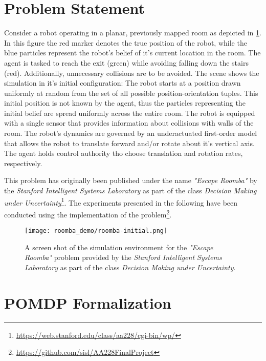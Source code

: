 \section{Problem Statement}\label{sec:lp-problem-statement}

Consider a robot operating in a planar, previously mapped room as depicted in
\cref{fig:roomba-env}. In this figure the red marker denotes the true position
of the robot, while the blue particles represent the robot's belief of it's
current location in the room. The agent is tasked to reach the exit (green)
while avoiding falling down the stairs (red). Additionally, unnecessary
collisions are to be avoided. The scene shows the simulation in it's initial
configuration: The robot starts at a position drawn uniformly at random from
the set of all possible position-orientation tuples. This initial position is
not known by the agent, thus the particles representing the initial belief are
spread uniformly across the entire room. The robot is equipped with a single
sensor that provides information about collisions with walls of the room. The
robot's dynamics are governed by an underactuated first-order model that allows
the robot to translate forward and/or rotate about it's vertical axis. The
agent holds control authority tho choose translation and rotation rates,
respectively.

This problem has originally been published under the name \emph{"Escape
Roomba"} by the \emph{Stanford Intelligent Systems Laboratory} as part of the
class \emph{Decision Making under
Uncertainty}\footnote{\url{https://web.stanford.edu/class/aa228/cgi-bin/wp/}}.
The experiments presented in the following have been conducted using the
\pomdpsjl implementation of the
problem\footnote{\url{https://github.com/sisl/AA228FinalProject}}.

\begin{figure}[htpb]
  \centering
  \texttt{[image: roomba\_demo/roomba-initial.png]}
  \caption{A screen shot of the simulation environment for the \emph{"Escape
  Roomba"} problem provided by the \emph{Stanford Intelligent Systems
  Laboratory} as part of the class \emph{Decision Making under Uncertainty}.}
  \label{fig:roomba-env}
\end{figure}

\clearpage
\section{POMDP Formalization}\label{sec:lp-pomdp-formalization}

